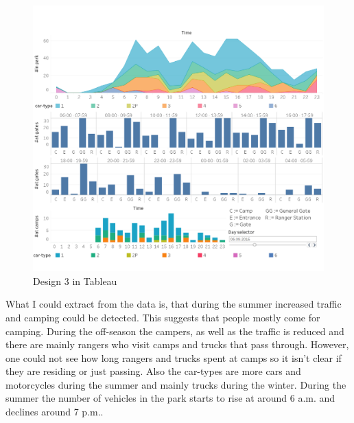 \documentclass{article}
\begin{document}
\begin{figure}[h]
	\centering
	\includegraphics[scale = .53]{tableau_design3.png}
	\caption{Design 3 in Tableau}
	\label{fig:tableau}
\end{figure}

What I could extract from the data is, that during the summer increased traffic and camping could be detected. This suggests that people mostly come for camping. During the off-season the campers, as well as the traffic is reduced and there are mainly rangers who visit camps and trucks that pass through. However, one could not see how long rangers and trucks spent at camps so it isn't clear if they are residing or just passing. Also the car-types are more cars and motorcycles during the summer and mainly trucks during the winter. During the summer the number of vehicles in the park starts to rise at around 6 a.m. and declines around 7 p.m..
\end{document}
